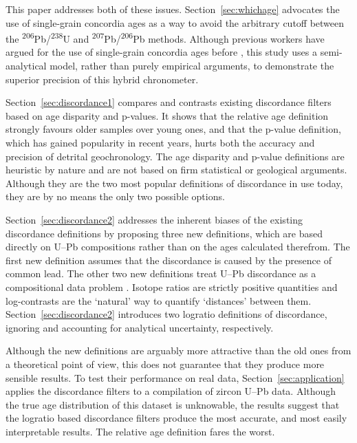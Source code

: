 \documentclass[gchron, manuscript]{copernicus}
\begin{document}
This paper addresses both of these issues. Section~\ref{sec:whichage}
advocates the use of single-grain concordia ages \citep{ludwig1998} as
a way to avoid the arbitrary cutoff between the
\textsuperscript{206}Pb/\textsuperscript{238}U and
\textsuperscript{207}Pb/\textsuperscript{206}Pb methods. Although
previous workers have argued for the use of single-grain concordia
ages before \citep[see][for a recent example]{zimmermann2018}, this
study uses a semi-analytical model, rather than purely empirical
arguments, to demonstrate the superior precision of this hybrid
chronometer.

Section~\ref{sec:discordance1} compares and contrasts existing
discordance filters based on age disparity and p-values. It shows that
the relative age definition strongly favours older samples over young
ones, and that the p-value definition, which has gained popularity in
recent years, hurts both the accuracy and precision of detrital
geochronology. The age disparity and p-value definitions are heuristic
by nature and are not based on firm statistical or geological
arguments.  Although they are the two most popular definitions of
discordance in use today, they are by no means the only two possible
options.

Section~\ref{sec:discordance2} addresses the inherent biases of the
existing discordance definitions by proposing three new definitions,
which are based directly on U--Pb compositions rather than on the ages
calculated therefrom. The first new definition assumes that the
discordance is caused by the presence of common lead. The other two
new definitions treat U--Pb discordance as a compositional data
problem \citep[\textit{sensu}][]{aitchison1986}.  Isotope ratios are
strictly positive quantities and log-contrasts are the `natural' way
to quantify `distances' between them.  Section~\ref{sec:discordance2}
introduces two logratio definitions of discordance, ignoring and
accounting for analytical uncertainty, respectively.

Although the new definitions are arguably more attractive than the old
ones from a theoretical point of view, this does not guarantee that
they produce more sensible results. To test their performance on real
data, Section~\ref{sec:application} applies the discordance filters to
a compilation of zircon U--Pb data. Although the true age distribution
of this dataset is unknowable, the results suggest that the logratio
based discordance filters produce the most accurate, and most easily
interpretable results. The relative age definition fares the worst.
\end{document}
